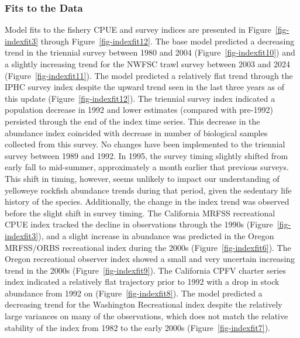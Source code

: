 \documentclass[
]{scrartcl}
\begin{document}
\subsubsection{Fits to the Data}\label{fits-to-the-data}

Model fits to the fishery CPUE and survey indices are presented in
Figure~\ref{fig-indexfit3} through Figure~\ref{fig-indexfit12}. The base
model predicted a decreasing trend in the triennial survey between 1980
and 2004 (Figure~\ref{fig-indexfit10}) and a slightly increasing trend
for the NWFSC trawl survey between 2003 and 2024
(Figure~\ref{fig-indexfit11}). The model predicted a relatively flat
trend through the IPHC survey index despite the upward trend seen in the
last three years as of this update (Figure~\ref{fig-indexfit12}). The
triennial survey index indicated a population decrease in 1992 and lower
estimates (compared with pre-1992) persisted through the end of the
index time series. This decrease in the abundance index coincided with
decrease in number of biological samples collected from this survey. No
changes have been implemented to the triennial survey between 1989 and
1992. In 1995, the survey timing slightly shifted from early fall to
mid-summer, approximately a month earlier that previous surveys. This
shift in timing, however, seems unlikely to impact our understanding of
yelloweye rockfish abundance trends during that period, given the
sedentary life history of the species. Additionally, the change in the
index trend was observed before the slight shift in survey timing. The
California MRFSS recreational CPUE index tracked the decline in
observations through the 1990s (Figure~\ref{fig-indexfit3}), and a
slight increase in abundance was predicted in the Oregon MRFSS/ORBS
recreational index during the 2000s (Figure~\ref{fig-indexfit6}). The
Oregon recreational observer index showed a small and very uncertain
increasing trend in the 2000s (Figure~\ref{fig-indexfit9}). The
California CPFV charter series index indicated a relatively flat
trajectory prior to 1992 with a drop in stock abundance from 1992 on
(Figure~\ref{fig-indexfit8}). The model predicted a decreasing trend for
the Washington Recreational index despite the relatively large variances
on many of the observations, which does not match the relative stability
of the index from 1982 to the early 2000s (Figure~\ref{fig-indexfit7}).
\end{document}
